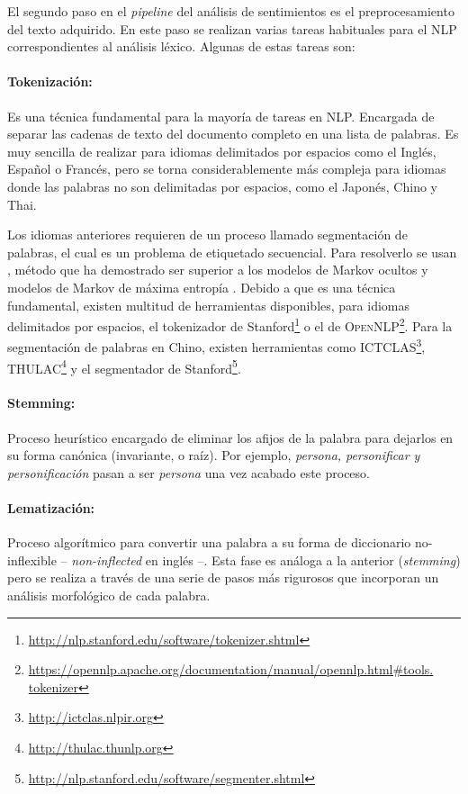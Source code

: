 El segundo paso en el \emph{pipeline} del análisis de sentimientos es el
preprocesamiento del texto adquirido. En este paso se realizan varias tareas
habituales para el \ac{NLP} correspondientes al análisis léxico. Algunas de
estas tareas son:

\label{par:token}
\paragraph{Tokenización:}Es una técnica fundamental para la mayoría de tareas en
\ac{NLP}. Encargada de separar las cadenas de texto del documento completo en
una lista de palabras. Es muy sencilla de realizar para idiomas delimitados por
espacios como el Inglés, Español o Francés, pero se torna considerablemente más
compleja para idiomas donde las palabras no son delimitadas por espacios, como
el Japonés, Chino y Thai.

Los idiomas anteriores requieren de un proceso llamado segmentación de palabras,
el cual es un problema de etiquetado secuencial. Para resolverlo se usan
, método que ha demostrado ser superior a los modelos de
Markov ocultos y modelos de Markov de máxima entropía \cite{Kudo04, tseng2005,
  Peng2004}. Debido a que es una técnica fundamental, existen multitud de
herramientas disponibles, para idiomas delimitados por espacios, el tokenizador
de Stanford\footnote{\url{http://nlp.stanford.edu/software/tokenizer.shtml}} o
el de
\textsc{OpenNLP}\footnote{\url{https://opennlp.apache.org/documentation/manual/opennlp.html\#tools.
    tokenizer}}. Para la segmentación de palabras en Chino, existen herramientas
como \textsc{ICTCLAS}\footnote{\url{http://ictclas.nlpir.org}},
\textsc{THULAC}\footnote{\url{http://thulac.thunlp.org}} y el segmentador de
Stanford\footnote{\url{http://nlp.stanford.edu/software/segmenter.shtml}}.

\paragraph{Stemming:}Proceso heurístico encargado de eliminar los afijos de la
palabra para dejarlos en su forma canónica (invariante, o raíz). Por ejemplo,
\emph{persona, personificar y personificación} pasan a ser \emph{persona} una
vez acabado este proceso.

\paragraph{Lematización:}Proceso algorítmico para convertir una palabra a su
forma de diccionario no-inflexible -- \emph{non-inflected} en inglés --. Esta
fase es análoga a la anterior (\emph{stemming}) pero se realiza a través de una
serie de pasos más rigurosos que incorporan un análisis morfológico de cada
palabra.

